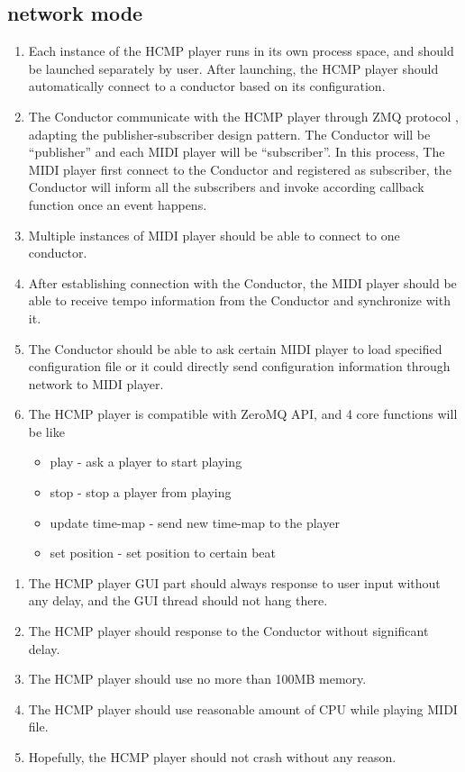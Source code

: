 \subsection{network mode}
\begin{enumerate}
  \item Each instance of the HCMP player runs in its own process space, and should 
        be launched separately by user.
        After launching, the HCMP player should automatically connect to a conductor 
        based on its configuration.
  \item The Conductor communicate with the HCMP player through ZMQ protocol 
        \cite{ZMQ}, adapting the publisher-subscriber design pattern. The 
        Conductor will be ``publisher'' and each MIDI player will be ``subscriber''. 
        In this process, The MIDI player first connect to the Conductor and 
        registered as subscriber, the Conductor will inform all the 
        subscribers and invoke according callback function once an event happens.
  \item Multiple instances of MIDI player should be able to connect to one conductor. 
  \item After establishing connection with the Conductor, the MIDI player 
        should be able to receive tempo information from the Conductor and 
        synchronize with it.     
  \item The Conductor should be able to ask certain MIDI player to load specified configuration file or it could directly 
        send configuration information through network to MIDI player.
  \item 
    The HCMP player is compatible with ZeroMQ \cite{zeromq} API, and 4 core 
    functions will be like
    \begin{itemize}
      \item play - ask a player to start playing 
      \item stop - stop a player from playing 
      \item update time-map - send new time-map to the player 
      \item set position - set position to certain beat 
    \end{itemize}
\end{enumerate}

\begin{enumerate}
  \item The HCMP player GUI part should always response to user input without 
        any delay, and the GUI thread should not hang there.
  \item The HCMP player should response to the Conductor without significant delay.
  \item The HCMP player should use no more than 100MB memory.
  \item The HCMP player should use reasonable amount of CPU while playing MIDI file.
  \item Hopefully, the HCMP player should not crash without any reason. 
\end{enumerate}
